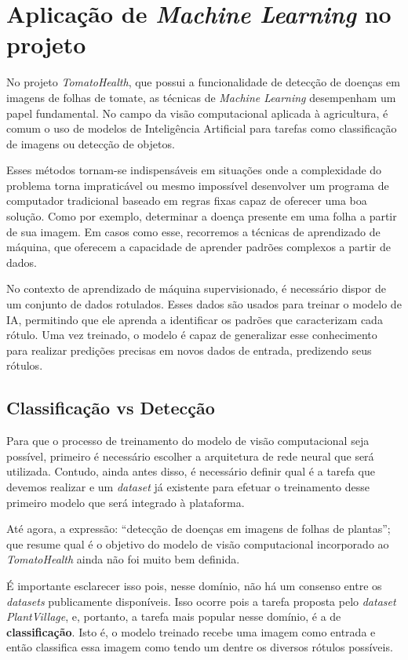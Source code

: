 \chapter{Aplicação de \emph{Machine Learning} no projeto}
No projeto \emph{TomatoHealth}, que possui a funcionalidade de detecção de doenças em imagens de folhas de tomate, as técnicas de \emph{Machine Learning} desempenham um papel fundamental. No campo da visão computacional aplicada à agricultura, é comum o uso de modelos de Inteligência Artificial para tarefas como classificação de imagens ou detecção de objetos.

Esses métodos tornam-se indispensáveis em situações onde a complexidade do problema torna impraticável ou mesmo impossível desenvolver um programa de computador tradicional baseado em regras fixas capaz de oferecer uma boa solução. Como por exemplo, determinar a doença presente em uma folha a partir de sua imagem. Em casos como esse, recorremos a técnicas de aprendizado de máquina, que oferecem a capacidade de aprender padrões complexos a partir de dados.

No contexto de aprendizado de máquina supervisionado, é necessário dispor de um conjunto de dados rotulados. Esses dados são usados para treinar o modelo de IA, permitindo que ele aprenda a identificar os padrões que caracterizam cada rótulo. Uma vez treinado, o modelo é capaz de generalizar esse conhecimento para realizar predições precisas em novos dados de entrada, predizendo seus rótulos.

\section{Classificação vs Detecção}
Para que o processo de treinamento do modelo de visão computacional seja possível, primeiro é necessário escolher a arquitetura de rede neural que será utilizada. Contudo, ainda antes disso, é necessário definir qual é a tarefa que devemos realizar e um \emph{dataset} já existente para efetuar o treinamento desse primeiro modelo que será integrado à plataforma.

Até agora, a expressão: ``detecção de doenças em imagens de folhas de plantas''; que resume qual é o objetivo do modelo de visão computacional incorporado ao \emph{TomatoHealth} ainda não foi muito bem definida.

É importante esclarecer isso pois, nesse domínio, não há um consenso entre os \emph{datasets} publicamente disponíveis. Isso ocorre pois a tarefa proposta pelo \emph{dataset PlantVillage}, e, portanto, a tarefa mais popular nesse domínio, é a de {\bf classificação}. Isto é, o modelo treinado recebe uma imagem como entrada e então classifica essa imagem como tendo um dentre os diversos rótulos possíveis.

